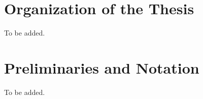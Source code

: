 \label{intro:chapter}



\section{Organization of the Thesis}
To be added.


\section{Preliminaries and Notation}

To be added.

